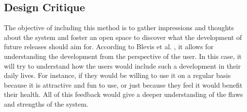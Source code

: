 \subsection{Design Critique}
The objective of including this method is to gather impressions and thoughts about the system and foster an open space to discover what the development of future releases should aim for. According to Blevis et al. \cite{Blevis2007}, it allows for understanding the development from the perspective of the user. In this case, it will try to understand how the users would include such a development in their daily lives. For instance, if they would be willing to use it on a regular basis because it is attractive and fun to use, or just because they feel it would benefit their health. All of this feedback would give a deeper understanding of the flaws and strengths of the system.

\iffalse
\quotes{Process of discourse on many levels of the nature and effects of an ultimate particular design}. \quotes{Comment on the qualities of an ultimate particular from an holistic perspective, including reason, ethics, and aesthetics as well as minute details of form and external effects on culture}.\cite{Blevis2007}
\fi


